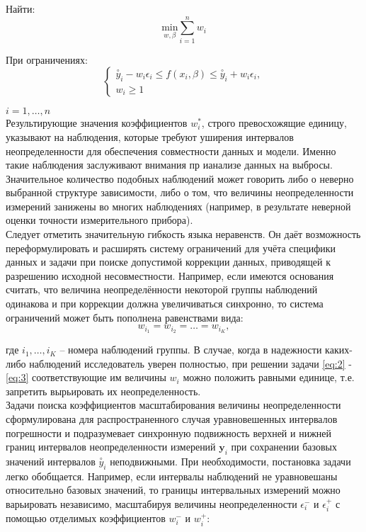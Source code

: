\documentclass[./main.tex]{subfiles}
\begin{document}
Найти: \\
\begin{equation} \label{eq:2}
	\underset {w, \beta}{\text{min}} \sum\limits_{i=1}^{n} w_i
\end{equation} 

При ограничениях: \\

\begin{equation} \label{eq:3}
	\begin{cases}
		\stackrel{\circ}{y}_i - w_i \epsilon_i \leq f(x_i,\beta) \leq \stackrel{\circ}{y}_i + w_i \epsilon_i, \\
		w_i \geq 1 
	\end{cases}
\end{equation} 

$i = 1, \ldots, n$ \\

Результирующие значения коэффициентов $w_{i}^{*}$, строго превосхожящие единицу, указывают на наблюдения, которые требуют уширения интервалов неопределенности для обеспечения совместности данных и модели. Именно такие наблюдения заслуживают внимания пр ианализе данных на выбросы. Значительное количество подобных наблюдений может говорить либо о неверно выбранной структуре зависимости, либо о том, что величины неопределенности измерений занижены во многих наблюдениях (например, в результате неверной оценки точности измерительного прибора). \\
Следует отметить значительную гибкость языка неравенств. Он даёт возможность переформулировать и расширять систему ограничений для учёта специфики данных и задачи при поиске допустимой коррекции данных, приводящей к разрешению исходной несовместности. Например, если имеются основания считать, что величина неопределённости некоторой группы наблюдений одинакова и при коррекции должна увеличиваться синхронно, то система ограничений может быть пополнена равенствами вида: \\

\begin{equation*}
	w_{i_1} = w_{i_{2}} = \ldots = w_{i_K}, 
\end{equation*}

где $i_1, \ldots, i_K$ -- номера наблюдений группы. В случае, когда в надежности каких-либо наблюдений исследователь уверен полностью, при решении задачи \eqref{eq:2} - \eqref{eq:3} соответствующие им величины $w_i$ можно положить равными единице, т.е. запретить вырьировать их неопределенность. \\
Задачи поиска коэффициентов масштабирования величины неопределенности сформулирована для распространенного случая уравновешенных интервалов погрешности и подразумевает синхронную подвижность верхней и нижней границ интервалов неопределенности измерений $\bm{y}_i$ при сохранении базовых значений интервалов $\stackrel{\circ}{y}_i$ неподвижными. При необходимости, постановка задачи легко обобщается. Например, если интервалы наблюдений не уравновешаны относительно базовых значений, то границы интервальных измерений можно варьировать независимо, масштабируя величины неопределенности $\epsilon_i^{-}$ и $\epsilon_{i}^{+}$ с помощью отделимых коэффициентов $w_i^{-}$ и $w_{i}^{+}$: \\
\end{document}
